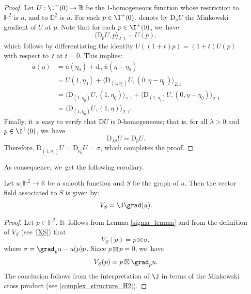 \begin{proof}
Let \(U: \I^+(0) \to \mathbb{R} \) be the 1-homogeneous function whose restriction to \(\mathbb{H}^2 \) is \(u \), and to \(\mathbb{D}^2 \) is \(\overline{u} \).
For each \(p \in \I^{+}(0) \), denote by \(\mathrm{D}_p U \) the Minkowski gradient of \(U \) at \(p \). Note that for each \(p \in \I^{+}(0) \), we~have
\[
\langle \mathrm{D}_p U, p \rangle_{2,1} = U(p),
\]
which follows by differentiating the identity \(U((1+t)p) = (1+t)U(p) \) with respect to~\(t \) at \(t=0 \).
This implies:
\begin{align*}
a(\eta) &= \overline{u}(\eta_0) + \mathrm{d}_{\eta_0} \overline{u}(\eta - \eta_0) \\
&= U(1, \eta_0) + \langle \mathrm{D}_{(1, \eta_0)} U, (0, \eta - \eta_0) \rangle_{2,1} \\
&= \langle \mathrm{D}_{(1, \eta_0)} U, (1, \eta_0) \rangle_{2,1} + \langle \mathrm{D}_{(1, \eta_0)} U, (0, \eta - \eta_0) \rangle_{2,1} \\
&= \langle \mathrm{D}_{(1, \eta_0)} U, (1, \eta) \rangle_{2,1}.
\end{align*}
Finally, it is easy to verify that \(\mathrm{D}U \) is 0-homogeneous; that is, for all \(\lambda > 0 \) and \(p \in \I^{+}(0) \), we~have
\[
\mathrm{D}_{\lambda p} U = \mathrm{D}_p U.
\]
Therefore, \(\mathrm{D}_{(1, \eta_0)} U = \mathrm{D}_{p_0} U = \sigma \), which completes the proof.
\end{proof}
As consequence, we~get the following corollary.
\begin{cor}\label{cor_formule_XS}
Let $u:\mathbb{H}^2\to\mathbb{R}$ be a smooth function and $S$ be the graph of $u$. Then the vector field associated to $S$ is given by:
\[
V_S=\J\grad(u).
\]
\end{cor}
\begin{proof}
Let $p\in\mathbb{H}^2$. It~follows from Lemma \ref{sigma_lemma} and from the definition of $V_S$ (see~\eqref{XS}) that
\[
V_S(p)=p\boxtimes\sigma,
\]
where
$\sigma=\grad_{p}u-u(p)p$. Since $p\boxtimes p=0$, we~have
\[
V_S(p)=p\boxtimes\grad_{p}u.
\]The conclusion follows from the interpretation of $\J$ in terms of the Minkowski cross product (see \eqref{complex_structure_H2}).
\end{proof}

